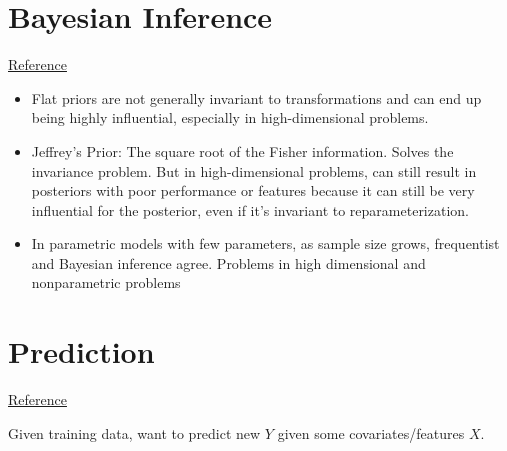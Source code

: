 \documentclass[12pt]{article}
\theoremstyle{plain}
\theoremstyle{definition}
\theoremstyle{remark}
\begin{document}
\clearpage
\section{Bayesian Inference}

\href{http://www.stat.cmu.edu/~larry/=stat705/Lecture14.pdf}{Reference}
\begin{itemize}
  \item
    Flat priors are not generally invariant to transformations and can
    end up being highly influential, especially in high-dimensional
    problems.
  \item
    Jeffrey's Prior:
    The square root of the Fisher information.
    Solves the invariance problem.
    But in high-dimensional problems, can still result in posteriors
    with poor performance or features because it can still be very
    influential for the posterior, even if it's invariant to
    reparameterization.
  \item In parametric models with few parameters, as sample size grows,
    frequentist and Bayesian inference agree.
    Problems in high dimensional and nonparametric problems
\end{itemize}


\clearpage
\section{Prediction}


\href{http://www.stat.cmu.edu/~larry/=stat705/Lecture15.pdf}{Reference}

Given training data, want to predict new $Y$ given some
covariates/features $X$.
\end{document}
